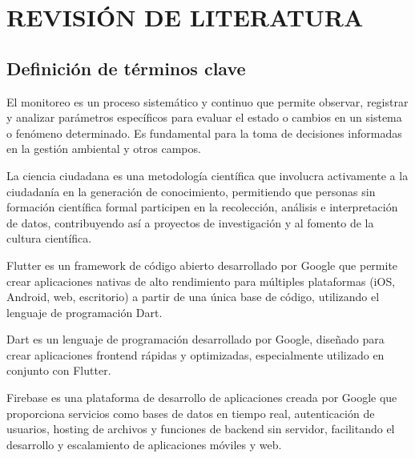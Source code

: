 \chapter{REVISIÓN DE LITERATURA}
\section{Definición de términos clave}

\begin{definition}[Monitoreo]
  El monitoreo es un proceso sistemático y continuo que permite observar, registrar y analizar parámetros específicos para evaluar el estado o cambios en un sistema o fenómeno determinado. Es fundamental para la toma de decisiones informadas en la gestión ambiental y otros campos. \cite{ciga_monitoreo}
\end{definition}


\begin{definition}
La ciencia ciudadana es una metodología científica que involucra activamente a la ciudadanía en la generación de conocimiento, permitiendo que personas sin formación científica formal participen en la recolección, análisis e interpretación de datos, contribuyendo así a proyectos de investigación y al fomento de la cultura científica.\cite{csic_ciencia_ciudadana}
\end{definition}




\begin{definition}[Flutter]

Flutter es un framework de código abierto desarrollado por Google que permite crear aplicaciones nativas de alto rendimiento para múltiples plataformas (iOS, Android, web, escritorio) a partir de una única base de código, utilizando el lenguaje de programación Dart.\cite{flutter_multiplataforma}
\end{definition}

\begin{definition}[Dart]

Dart es un lenguaje de programación desarrollado por Google, diseñado para crear aplicaciones frontend rápidas y optimizadas, especialmente utilizado en conjunto con Flutter.
\end{definition}
\begin{definition}[Firebase]

Firebase es una plataforma de desarrollo de aplicaciones creada por Google que proporciona servicios como bases de datos en tiempo real, autenticación de usuarios, hosting de archivos y funciones de backend sin servidor, facilitando el desarrollo y escalamiento de aplicaciones móviles y web.
\end{definition}


